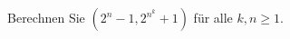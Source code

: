 
\begin{exercise}

Berechnen Sie $(2^n - 1,2^{n^k} + 1)$ für alle $k, n \geq 1$.

\end{exercise}


\begin{solution}

\phantom{}

\end{solution}

